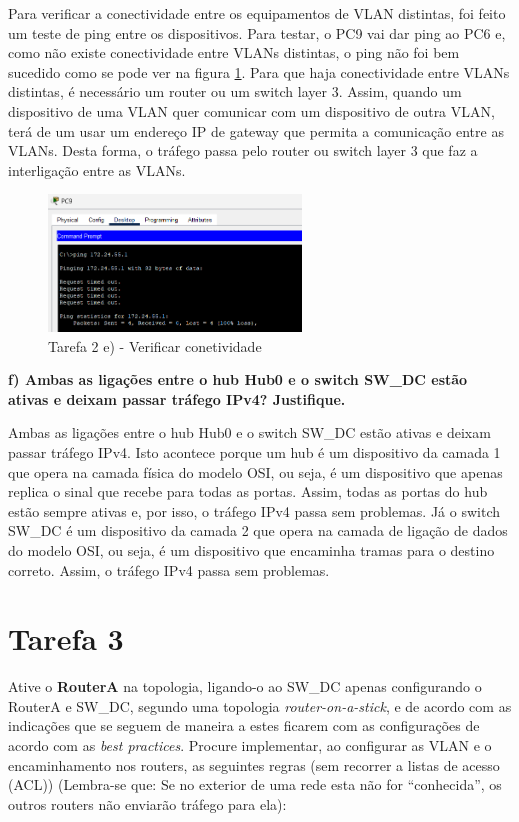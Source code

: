 \documentclass[11pt,english, openright, oneside]{book}
\begin{document}
Para verificar a conectividade entre os equipamentos de VLAN distintas, foi feito um teste de ping entre os dispositivos. Para testar, o PC9 vai dar ping ao PC6 e, como não existe conectividade entre VLANs distintas, o ping não foi bem sucedido como se pode ver na figura \ref{fig:2e}.
Para que haja conectividade entre VLANs distintas, é necessário um router ou um switch layer 3. Assim, quando um dispositivo de uma VLAN quer comunicar com um dispositivo de outra VLAN, terá de um usar um endereço IP de gateway que permita a comunicação entre as VLANs. Desta forma, o tráfego passa pelo router ou switch layer 3 que faz a interligação entre as VLANs.

\begin{figure}[H]
    \centering
    \includegraphics[width=0.6\textwidth]{imagens/Tarefa2/2.e.png}
    \caption{Tarefa 2 e) - Verificar conetividade}
    \label{fig:2e}
\end{figure}

\vspace{0.8cm}

\textbf{f) Ambas as ligações entre o hub Hub0 e o switch  SW\_DC estão ativas e deixam passar tráfego IPv4? Justifique.}
\vspace{0.2cm}

Ambas as ligações entre o hub Hub0 e o switch SW\_DC estão ativas e deixam passar tráfego IPv4. Isto acontece porque um hub é um dispositivo da camada 1 que opera na camada física do modelo OSI, ou seja, é um dispositivo que apenas replica o sinal que recebe para todas as portas. Assim, todas as portas do hub estão sempre ativas e, por isso, o tráfego IPv4 passa sem problemas. Já o switch SW\_DC é um dispositivo da camada 2 que opera na camada de ligação de dados do modelo OSI, ou seja, é um dispositivo que encaminha tramas para o destino correto. Assim, o tráfego IPv4 passa sem problemas.

\vspace{0.8cm}

\pagebreak


\section{Tarefa 3}
Ative o \textbf{RouterA} na topologia, ligando-o ao SW\_DC apenas configurando o RouterA e SW\_DC, segundo uma topologia \textit{router-on-a-stick}, e de acordo com as indicações que se seguem de maneira a estes ficarem com as configurações de acordo com as \textit{best practices}. Procure implementar, ao configurar as VLAN e o encaminhamento nos routers, as seguintes regras (sem recorrer a listas de acesso (ACL)) (Lembra-se que: Se no exterior de uma rede esta não for “conhecida”, os outros routers não enviarão tráfego para ela):
\end{document}
